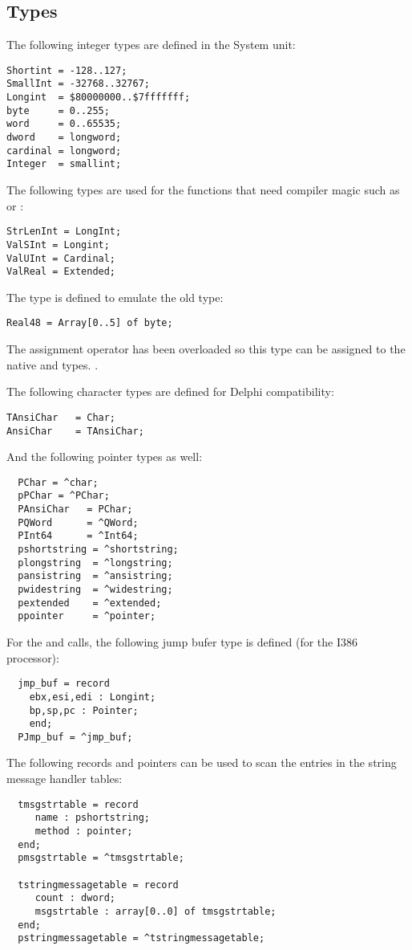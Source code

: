 \subsection{Types}
The following integer types are defined in the System unit:
\begin{verbatim}
Shortint = -128..127;
SmallInt = -32768..32767;
Longint  = $80000000..$7fffffff;
byte     = 0..255;
word     = 0..65535;
dword    = longword;
cardinal = longword;
Integer  = smallint;
\end{verbatim}
The following types are used for the functions that need compiler magic
such as  or :
\begin{verbatim}
StrLenInt = LongInt;
ValSInt = Longint;
ValUInt = Cardinal;
ValReal = Extended;
\end{verbatim}
The  type is defined to emulate the old \tp {} type:
\begin{verbatim}
Real48 = Array[0..5] of byte;
\end{verbatim}
The assignment operator has been overloaded so this type can be assigned
to the \fpc native  and  types.
.

The following character types are defined for Delphi compatibility:
\begin{verbatim}
TAnsiChar   = Char;
AnsiChar    = TAnsiChar;
\end{verbatim}
And the following pointer types as well:
\begin{verbatim}
  PChar = ^char;
  pPChar = ^PChar;
  PAnsiChar   = PChar;
  PQWord      = ^QWord;
  PInt64      = ^Int64;
  pshortstring = ^shortstring;
  plongstring  = ^longstring;
  pansistring  = ^ansistring;
  pwidestring  = ^widestring;
  pextended    = ^extended;
  ppointer     = ^pointer;
\end{verbatim}
For the  and  calls, the following jump bufer
type is defined (for the I386 processor):
\begin{verbatim}
  jmp_buf = record
    ebx,esi,edi : Longint;
    bp,sp,pc : Pointer;
    end;
  PJmp_buf = ^jmp_buf;
\end{verbatim}
The following records and pointers can be used to scan the
entries in the string message handler tables:
\begin{verbatim}
  tmsgstrtable = record
     name : pshortstring;
     method : pointer;
  end;
  pmsgstrtable = ^tmsgstrtable;

  tstringmessagetable = record
     count : dword;
     msgstrtable : array[0..0] of tmsgstrtable;
  end;
  pstringmessagetable = ^tstringmessagetable;
\end{verbatim}


